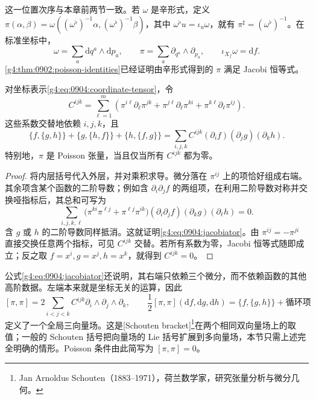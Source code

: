 这一位置次序与本章前两节一致。若 \(\omega\) 是辛形式，定义 \(\pi(\alpha,\beta)=\omega((\omega^\flat)^{-1}\alpha,(\omega^\flat)^{-1}\beta)\)，其中 \(\omega^\flat u=\iota_u\omega\)，就有 \(\pi^\sharp=(\omega^\flat)^{-1}\)。在标准坐标中，
\[
	\omega=\sum_a\mathrm{d}q^a\wedge\mathrm{d}p_a,
	\qquad \pi=\sum_a\partial_{q^a}\wedge\partial_{p_a},
	\qquad \iota_{X_f}\omega=\mathrm{d}f.
\]
\cref{g4:thm:0902:poisson-identities}已经证明由辛形式得到的 \(\pi\) 满足 Jacobi 恒等式。

\begin{proposition}\label{g4:prop:0904:jacobi-schouten}
	对坐标表示\eqref{g4:eq:0904:coordinate-tensor}，令
	\begin{equation}\label{g4:eq:0904:jacobi-coefficients}
		C^{ijk}=\sum_{\ell=1}^m\left(
			\pi^{i\ell}\partial_\ell\pi^{jk}
			+\pi^{j\ell}\partial_\ell\pi^{ki}
			+\pi^{k\ell}\partial_\ell\pi^{ij}
		\right).
	\end{equation}
	这些系数交替地依赖 \(i,j,k\)，且
	\begin{equation}\label{g4:eq:0904:jacobiator}
		\{f,\{g,h\}\}+\{g,\{h,f\}\}+\{h,\{f,g\}\}
		=\sum_{i,j,k}C^{ijk}(\partial_i f)(\partial_j g)(\partial_k h).
	\end{equation}
	特别地，\(\pi\) 是 Poisson 张量，当且仅当所有 \(C^{ijk}\) 都为零。
\end{proposition}

\begin{proof}
	将内层括号代入外层，并对乘积求导。微分落在 \(\pi^{ij}\) 上的项恰好组成右端。其余项含某个函数的二阶导数；例如含 \(\partial_i\partial_j f\) 的两组项，在利用二阶导数对称并交换哑指标后，其总和可写为
	\[
		\sum_{i,j,k,\ell}
		\bigl(\pi^{ki}\pi^{\ell j}+\pi^{\ell j}\pi^{ik}\bigr)
		(\partial_i\partial_j f)(\partial_k g)(\partial_\ell h)=0.
	\]
	含 \(g\) 或 \(h\) 的二阶导数同样抵消。这就证明\eqref{g4:eq:0904:jacobiator}。由 \(\pi^{ij}=-\pi^{ji}\) 直接交换任意两个指标，可见 \(C^{ijk}\) 交替。若所有系数为零，Jacobi 恒等式随即成立；反之取 \(f=x^i,g=x^j,h=x^k\)，就得到 \(C^{ijk}=0\)。
\end{proof}

公式\eqref{g4:eq:0904:jacobiator}还说明，其右端只依赖三个微分，而不依赖函数的其他高阶数据。左端本来就是坐标无关的运算，因此
\begin{equation}\label{g4:eq:0904:schouten-self-bracket}
	[\pi,\pi]
	=2\sum_{i<j<k}C^{ijk}\partial_i\wedge\partial_j\wedge\partial_k,
	\qquad
	\frac12[\pi,\pi](\mathrm{d}f,\mathrm{d}g,\mathrm{d}h)
	=\{f,\{g,h\}\}+\text{循环项}
\end{equation}
定义了一个全局三向量场。这是[Schouten bracket]\footnote{Jan Arnoldus Schouten（1883--1971），荷兰数学家，研究张量分析与微分几何。}在两个相同双向量场上的取值；一般的 Schouten 括号把向量场的 Lie 括号扩展到多向量场，本节只需上述完全明确的情形。Poisson 条件由此简写为 \([\pi,\pi]=0\)。

